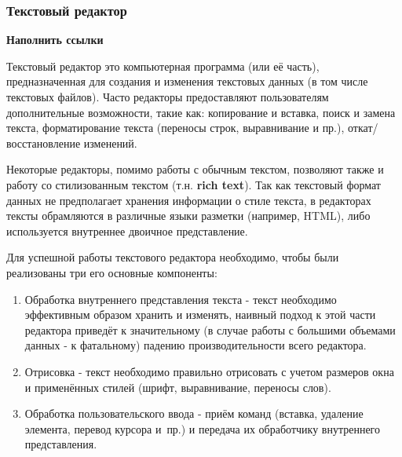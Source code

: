 \documentclass{fefu}
\begin{document}
			\subsubsection{Текстовый редактор}
				\textbf{Наполнить ссылки}
				\par Текстовый редактор это компьютерная программа (или её часть), 
				предназначенная для создания и изменения текстовых данных (в том числе 
				текстовых файлов). Часто редакторы предоставляют пользователям дополнительные 
				возможности, такие как: копирование и вставка, поиск и замена текста, 
				форматирование текста (переносы строк, выравнивание и пр.), 
				откат/восстановление изменений. 
				\par Некоторые редакторы, помимо работы с обычным текстом, позволяют также и
				работу со стилизованным текстом (т.н. \textbf{rich text}). Так как текстовый
				формат данных не предполагает хранения информации о стиле текста, в редакторах
				тексты обрамляются в различные языки разметки (например, HTML), либо
				используется внутреннее двоичное представление.
				\par Для успешной работы текстового редактора необходимо, чтобы были
				реализованы три его основные компоненты: \cite{CraftOfTextEditing}
				\begin{enumerate}
					\item Обработка внутреннего представления текста - текст необходимо
					эффективным образом хранить и изменять, наивный подход к этой части
					редактора приведёт к значительному (в случае работы с большими объемами
					данных - к фатальному) падению производительности всего редактора.
					\item Отрисовка - текст необходимо правильно отрисовать с учетом размеров
					окна и применённых стилей (шрифт, выравнивание, переносы слов).
					\item Обработка пользовательского ввода - приём команд
					(вставка, удаление элемента, перевод курсора и~пр.) и передача их
					обработчику внутреннего представления.
				\end{enumerate}
\end{document}
